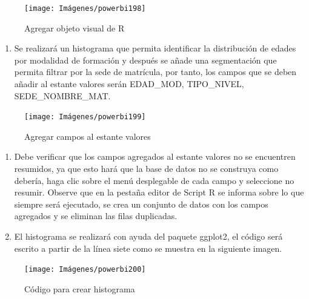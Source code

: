 \documentclass[
]{book}
\providecommand{\tightlist}{%
  \setlength{\itemsep}{0pt}\setlength{\parskip}{0pt}}
\begin{document}
\begin{figure}

{\centering \texttt{[image: Imágenes/powerbi198]} 

}

\caption{Agregar objeto visual de R}\label{fig:paso2histogramapowerbi-fig}
\end{figure}

\begin{enumerate}
\def\labelenumi{\arabic{enumi}.}
\setcounter{enumi}{2}
\tightlist
\item
  Se realizará un histograma que permita identificar la distribución de edades por modalidad de formación y después se añade una segmentación que permita filtrar por la sede de matrícula, por tanto, los campos que se deben añadir al estante valores serán EDAD\_MOD, TIPO\_NIVEL, SEDE\_NOMBRE\_MAT.
\end{enumerate}

\begin{figure}

{\centering \texttt{[image: Imágenes/powerbi199]} 

}

\caption{Agregar campos al estante valores}\label{fig:paso3histogramapowerbi-fig}
\end{figure}

\begin{enumerate}
\def\labelenumi{\arabic{enumi}.}
\setcounter{enumi}{3}
\item
  Debe verificar que los campos agregados al estante valores no se encuentren resumidos, ya que esto hará que la base de datos no se construya como debería, haga clic sobre el menú desplegable de cada campo y seleccione no resumir. Observe que en la pestaña editor de Script R se informa sobre lo que siempre será ejecutado, se crea un conjunto de datos con los campos agregados y se eliminan las filas duplicadas.
\item
  El histograma se realizará con ayuda del paquete ggplot2, el código será escrito a partir de la línea siete como se muestra en la siguiente imagen.
\end{enumerate}

\begin{figure}

{\centering \texttt{[image: Imágenes/powerbi200]} 

}

\caption{Código para crear histograma}\label{fig:paso5histogramapowerbi-fig}
\end{figure}
\end{document}
